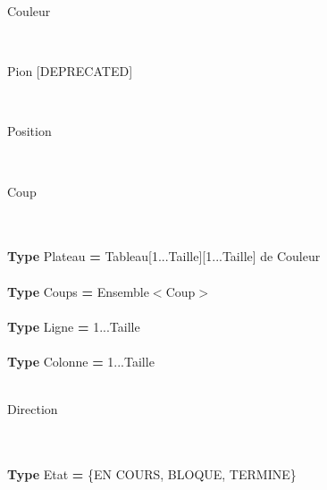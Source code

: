 \begin{algorithme}

	\begin{enregistrement}{Couleur}
	\end{enregistrement}
\\
	\begin{enregistrement}{Pion [DEPRECATED]}
	\end{enregistrement}
\\
	\begin{enregistrement}{Position}
	\end{enregistrement}
\\

	\begin{enregistrement}{Coup}
	\end{enregistrement}
\\\\
	\textbf{Type} Plateau \textbf{=} Tableau[1...Taille][1...Taille] de Couleur
\\\\
	\textbf{Type} Coups \textbf{=} Ensemble$<$Coup$>$
\\\\
	\textbf{Type} Ligne \textbf{=} 1...Taille
\\\\
	\textbf{Type} Colonne \textbf{=} 1...Taille
\\\\
	\begin{enregistrement}{Direction}
	\end{enregistrement}
\\\\
	\textbf{Type} Etat \textbf{=} {\{EN COURS, BLOQUE, TERMINE\}}


\end{algorithme}
